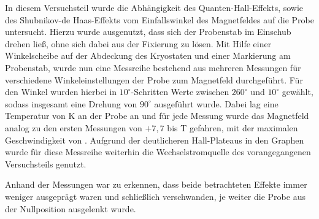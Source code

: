 
In diesem Versuchsteil wurde die Abhängigkeit des Quanten-Hall-Effekts, sowie des Shubnikov-de Haas-Effekts vom Einfallswinkel des Magnetfeldes auf die Probe untersucht. Hierzu wurde ausgenutzt, dass sich der Probenstab im Einschub drehen ließ, ohne sich dabei aus der Fixierung zu lösen. 
Mit Hilfe einer Winkelscheibe auf der Abdeckung des Kryostaten und einer Markierung am Probenstab, wurde nun eine Messreihe bestehend aus mehreren Messungen für verschiedene Winkeleinstellungen der Probe zum Magnetfeld durchgeführt. Für den Winkel wurden hierbei in $10^\circ$-Schritten Werte zwischen $260^\circ$ und $10^\circ$  gewählt, sodass insgesamt eine Drehung von $90^\circ$ ausgeführt wurde. Dabei lag eine Temperatur von \unit[2]{K} an der Probe an und für jede Messung wurde das Magnetfeld analog zu den ersten Messungen von $+7,7$ bis \unit[-7,7]{T} gefahren, mit der maximalen Geschwindigkeit von . Aufgrund der deutlicheren Hall-Plateaus in den Graphen wurde für diese Messreihe weiterhin die Wechselstromquelle des vorangegangenen Versuchsteils genutzt. 

Anhand der Messungen war zu erkennen, dass beide betrachteten Effekte immer weniger ausgeprägt waren und schließlich verschwanden, je weiter die Probe aus der Nullposition ausgelenkt wurde. 